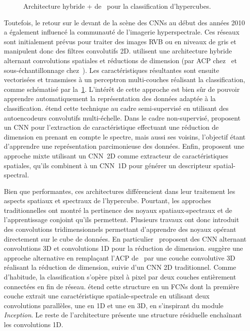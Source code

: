 \begin{figure}[h]
  \resizebox{\textwidth}{!}{}
  \caption[Architecture hybride + pour la classification d'hypercubes.]{Architecture hybride + de~\citet{makantasis_deep_2015} pour la classification d'hypercubes.}
  \label{fig:pcacnn}
\end{figure}

Toutefois, le retour sur le devant de la scène des \glspl{CNN} au début des années 2010 a également influencé la communauté de l'imagerie hyperspectrale. Ces réseaux sont initialement prévus pour traiter des images \gls{RVB} ou en niveaux de gris et manipulent donc des filtres convolutifs 2D. \citet{makantasis_deep_2015,slavkovikj_hyperspectral_2015} utilisent une architecture hybride alternant convolutions spatiales et réductions de dimension (par \gls{ACP} chez~\citet{makantasis_deep_2015} et sous-échantillonnage chez~\citet{slavkovikj_hyperspectral_2015}). Les caractéristiques résultantes sont ensuite vectorisées et transmises à un perceptron multi-couches réalisant la classification, comme schématisé par la~\cref{fig:pcacnn}. L'intérêt de cette approche est bien sûr de pouvoir apprendre automatiquement la représentation des données adaptée à la classification. \citet{zhao_combining_2015} étend cette technique au cadre semi-supervisé en utilisant des autoencodeurs convolutifs multi-échelle. Dans le cadre non-supervisé, \citet{romero_unsupervised_2015} proposent un \gls{CNN} pour l'extraction de caractéristique effectuant une réduction de dimension en prenant en compte le spectre, mais aussi ses voisins, l'objectif étant d'apprendre une représentation parcimonieuse des données. Enfin, \citet{zhao_spectral-spatial_2016,yue_spectral-spatial_2015} proposent une approche mixte utilisant un \gls{CNN}~2D comme extracteur de caractéristiques spatiales, qu'ils combinent à un \gls{CNN}~1D pour générer un descripteur spatial-spectral.


Bien que performantes, ces architectures différencient dans leur traitement les aspects spatiaux et spectraux de l'hypercube. Pourtant, les approches traditionnelles ont montré la pertinence des noyaux spatiaux-spectraux et de l'apprentissage conjoint qu'ils permettent. Plusieurs travaux ont donc introduit des convolutions tridimensionnels permettant d'apprendre des noyaux opérant directement sur le cube de données. En particulier~\citet{ben_hamida_deep_2016,chen_deep_2016} proposent des \gls{CNN} alternant convolutions 3D et convolutions 1D pour la réduction de dimension. \citet{luo_hsi-cnn_2018} suggère une approche alternative en remplaçant l'\gls{ACP} de~\citet{slavkovikj_hyperspectral_2015} par une couche convolutive 3D réalisant la réduction de dimension, suivie d'un \gls{CNN} 2D traditionnel. Comme d'habitude, la classification s'opère pixel à pixel par deux couches entièrement connectées en fin de réseau. \citet{lee_contextual_2016} étend cette structure en un \glspl{FCN} dont la première couche extrait une caractéristique spatiale-spectrale en utilisant deux convolutions parallèles, une en 1D et une en 3D, en s'inspirant du module \emph{Inception}. Le reste de l'architecture présente une structure résiduelle enchaînant les convolutions 1D.

